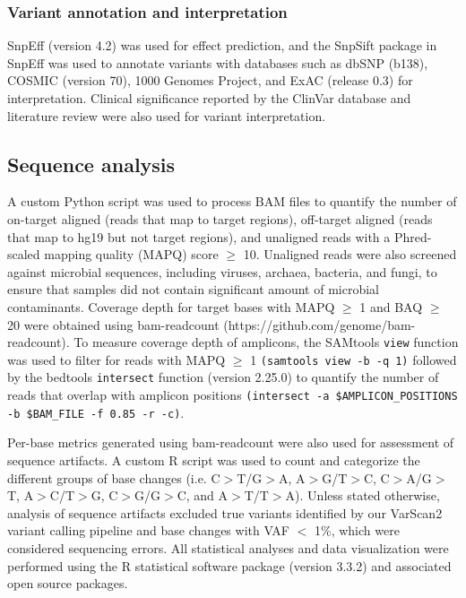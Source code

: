 \documentclass{bmcart}
\begin{document}
\subsubsection*{Variant annotation and interpretation}

SnpEff (version 4.2) was used for effect prediction, and the SnpSift package in SnpEff was used to annotate variants with databases such as dbSNP (b138), COSMIC (version 70), 1000 Genomes Project, and ExAC (release 0.3) for interpretation. Clinical significance reported by the ClinVar database and literature review were also used for variant interpretation.

\subsection*{Sequence analysis}

A custom Python script was used to process BAM files to quantify the number of on-target aligned (reads that map to target regions), off-target aligned (reads that map to hg19 but not target regions), and unaligned reads with a Phred-scaled mapping quality (MAPQ) score $\geq$ 10. Unaligned reads were also screened against microbial sequences, including viruses, archaea, bacteria, and fungi, to ensure that samples did not contain significant amount of microbial contaminants. Coverage depth for target bases with MAPQ $\geq$ 1 and BAQ $\geq$ 20 were obtained using bam-readcount (https://github.com/genome/bam-readcount). To measure coverage depth of amplicons, the SAMtools \texttt{view} function was used to filter for reads with MAPQ $\geq$ 1 \texttt{(samtools view -b -q 1)} followed by the bedtools \texttt{intersect} function (version 2.25.0) to quantify the number of reads that overlap with amplicon positions \texttt{(intersect -a \$AMPLICON\_POSITIONS -b \$BAM\_FILE -f 0.85 -r -c)}.

Per-base metrics generated using bam-readcount were also used for assessment of sequence artifacts. A custom R script was used to count and categorize the different groups of base changes (i.e. C$>$T/G$>$A, A$>$G/T$>$C, C$>$A/G$>$T, A$>$C/T$>$G, C$>$G/G$>$C, and A$>$T/T$>$A). Unless stated otherwise, analysis of sequence artifacts excluded true variants identified by our VarScan2 variant calling pipeline and base changes with VAF $<$ 1\%, which were considered sequencing errors. All statistical analyses and data visualization were performed using the R statistical software package (version 3.3.2) and associated open source packages.
\end{document}
